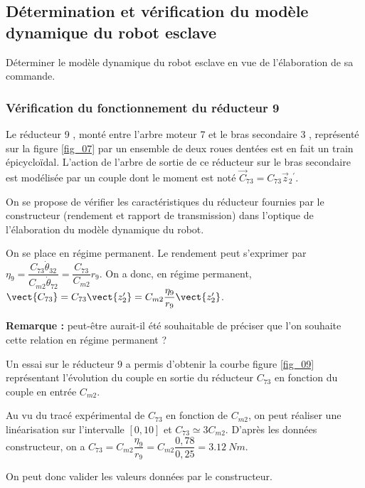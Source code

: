 \subsection{Détermination et vérification du modèle dynamique du robot esclave}
\begin{obj}
Déterminer le modèle dynamique du robot esclave en vue de l'élaboration de sa commande.
\end{obj}
\subsubsection{Vérification du fonctionnement du réducteur 9}
Le réducteur 9 , monté entre l'arbre moteur 7 et le bras secondaire 3 , représenté sur la figure \ref{fig_07} par un ensemble de deux roues dentées est en fait un train épicycloïdal. L'action de l'arbre de sortie de ce réducteur sur le bras secondaire est modélisée par un couple dont le moment est noté $\vec{C}_{73}=C_{73} \vec{z}_{2}{ }^{\prime}$.

On se propose de vérifier les caractéristiques du réducteur fournies par le constructeur (rendement et rapport de transmission) dans l'optique de l'élaboration du modèle dynamique du robot.

\ifprof
\begin{corrige}
On se place en régime permanent. Le rendement peut s'exprimer par 
$\eta_9 =\dfrac{C_{73}\dot{\theta}_{32}}{C_{m2}\dot{\theta}_{72}}=\dfrac{C_{73}}{C_{m2}}r_9$. 
On a donc, en régime permanent, $\vect{C_{73}}=C_{73}\vect{z'_2}=C_{m2}\dfrac{\eta_9}{r_9}\vect{z'_2}$.


\textbf{Remarque :} peut-être aurait-il été souhaitable de préciser que l'on souhaite cette relation en régime permanent ?
\end{corrige}
\else
\fi


Un essai sur le réducteur 9 a permis d'obtenir la courbe figure \ref{fig_09} représentant l'évolution du couple en sortie du réducteur $C_{73}$ en fonction du couple en entrée $C_{m 2}$.\\
\ifprof
\begin{corrige}
Au vu du tracé expérimental de $C_{73}$ en fonction de $C_{m2}$, on peut réaliser une linéarisation sur l'intervalle $[0,10]$ et $C_{73}\simeq 3 C_{m2}$. 
D'après les données constructeur, on a $C_{73}=C_{m2}\dfrac{\eta_9}{r_9}=C_{m2}\dfrac{0,78}{0,25}=\SI{3,12}{Nm}$.

On peut donc valider les valeurs données par le constructeur.
\end{corrige}
\else
\fi


